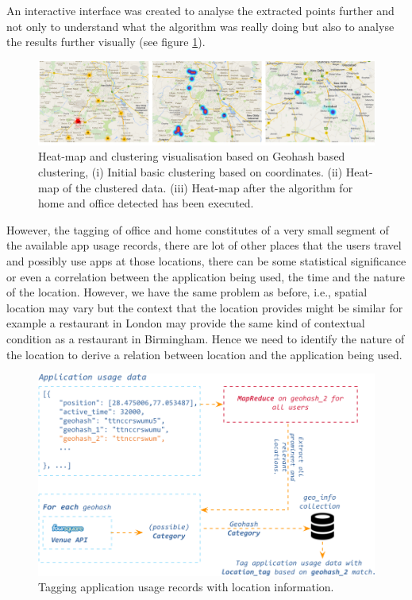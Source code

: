 \documentclass[prodmode,acmtecs]{acmsmall}
\begin{document}
An interactive interface was created to analyse the extracted points further and not only to understand what the algorithm was really doing but also to analyse the results further visually (see figure \ref{fig:geohashclustering}).

\begin{figure}[hbtp]
 \centering
 \includegraphics[width=120mm]{map.png}
  \caption {Heat-map and clustering visualisation based on Geohash based clustering, (i) Initial basic clustering based on coordinates. (ii) Heat-map of the clustered data. (iii) Heat-map after the algorithm for home and office detected has been executed.}
 \label{fig:geohashclustering}
\end{figure}

However, the tagging of office and home constitutes of a very small segment of the available app usage records, there are lot of other places that the users travel and possibly use apps at those locations, there can be some statistical significance or even a correlation between the application being used, the time and the nature of the location. However, we have the same problem as before, i.e., spatial location may vary but the context that the location provides might be similar for example a restaurant in London may provide the same kind of contextual condition as a restaurant in Birmingham. Hence we need to identify the nature of the location to derive a relation between location and the application being used. 

\begin{figure}[hbtp]
 \centering
 \includegraphics[width=120mm]{fsq_tagging.png}
  \caption {Tagging application usage records with location information.}
 \label{fig:appfsqtagging}
\end{figure}
\end{document}
